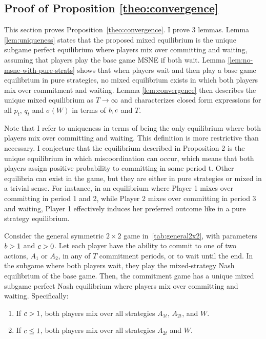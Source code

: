 \documentclass[main.tex]{subfiles}
\begin{document}
\subsection{Proof of Proposition \ref{theo:convergence}}\label{sec:prooftheo2}
This section proves Proposition~\ref{theo:convergence}. I prove 3 lemmas. 
Lemma \ref{lem:uniqueness} states that the proposed mixed equilibrium is the unique subgame perfect equilibrium where players mix over committing and waiting, assuming that players play the base game MSNE if both wait. 
Lemma \ref{lem:no-msne-with-pure-strats} shows that when players wait and then play a base game equilibrium in pure strategies, no mixed equilibrium exists in which both players mix over commitment and waiting. 
Lemma \ref{lem:convergence} then describes the unique mixed equilibrium as $T\to\infty$ and characterizes closed form expressions for all $p_t$, $q_t$ and $\sigma(W)$ in terms of $b,c$ and $T$.

Note that I refer to uniqueness in terms of being the only equilibrium where both players mix over committing and waiting. This definition is more restrictive than necessary. I conjecture that the equilibrium described in Proposition 2 is the unique equilibrium in which miscoordination can occur, which means that both players assign positive probability to committing in some period t. 
Other equilibria can exist in the game, but they are either in pure strategies or mixed in a trivial sense. For instance, in an equilibrium where Player 1 mixes over committing in period 1 and 2, while Player 2 mixes over committing in period 3 and waiting, Player 1 effectively induces her preferred outcome like in a pure strategy equilibrium.


\begin{lemma}\label{lem:uniqueness}
Consider the general symmetric $2\times2$ game in~\autoref{tab:general2x2}, with parameters $b > 1$ and $c > 0$. Let each player have the ability to commit to one of two actions, $A_1$ or $A_2$, in any of $T$ commitment periods, or to wait until the end. In the subgame where both players wait, they play the mixed-strategy Nash equilibrium of the base game. Then, the commitment game has a unique mixed subgame perfect Nash equilibrium where players mix over committing and waiting. Specifically:
\begin{enumerate}
    \item If $c > 1$, both players mix over all strategies $A_{1t}$, $A_{2t}$, and $W$.
    \item If $c \leq 1$, both players mix over all strategies $A_{2t}$ and $W$.
\end{enumerate}
\end{lemma}
\end{document}
